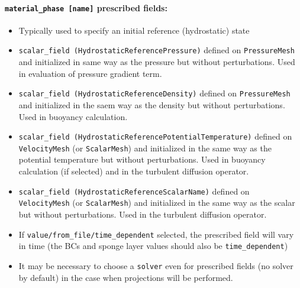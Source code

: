 \documentclass[10pt,a4paper]{article}
\begin{document}
\paragraph{\texttt{material\_phase [name]} prescribed fields:}
\begin{itemize}
\item Typically used to specify an initial reference (hydrostatic) state
\item \texttt{scalar\_field (HydrostaticReferencePressure)} defined on \texttt{PressureMesh} and initialized in same way as the pressure but without perturbations. Used in evaluation of pressure gradient term.
\item \texttt{scalar\_field (HydrostaticReferenceDensity)} defined on \texttt{PressureMesh} and initialized in the saem way as the density but without perturbations. Used in buoyancy calculation.
\item \texttt{scalar\_field (HydrostaticReferencePotentialTemperature)} defined on \texttt{VelocityMesh} (or \texttt{ScalarMesh}) and initialized in the same way as the potential temperature but without perturbations. Used in buoyancy calculation (if selected) and in the turbulent diffusion operator.
\item \texttt{scalar\_field (HydrostaticReferenceScalarName)} defined on \texttt{VelocityMesh} (or \texttt{ScalarMesh}) and initialized in the same way as the scalar but without perturbations. Used in the turbulent diffusion operator.
\item If \texttt{value/from\_file/time\_dependent} selected, the prescribed field will vary in time (the BCs and sponge layer values should also be \texttt{time\_dependent})
\item It may be necessary to choose a \texttt{solver} even for prescribed fields (no solver by default) in the case when projections will be performed.
\end{itemize}
\end{document}

